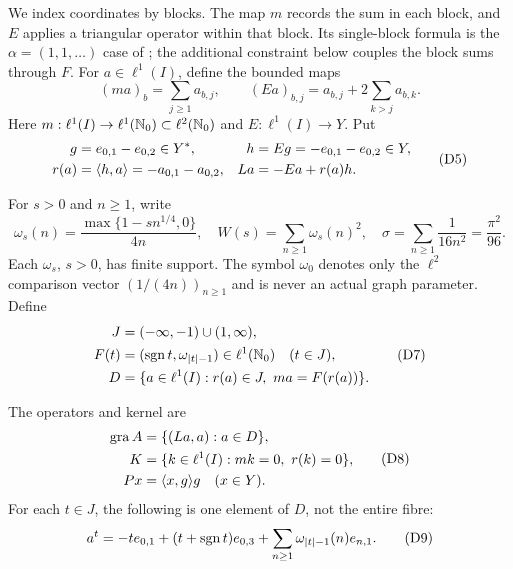 We index coordinates by blocks. The map $m$ records the sum in each block,
and $E$ applies a triangular operator within that block. Its single-block
formula is the $\alpha=(1,1,\ldots)$ case of
\cite[author version, Example~4.1]{bauschkeetal2011}; the additional constraint below
couples the block sums through $F$.
For $a\in\ell^1(I)$, define the bounded maps
\begin{equation}
(ma)_b=\sum_{j\ge1}a_{b,j},\qquad
(Ea)_{b,j}=a_{b,j}+2\sum_{k>j}a_{b,k}.
\tag{D4}\label{eq:D4}
\end{equation}
Here $m:\ell^1(I)\to\ell^1(\mathbb N_0)\subset\ell^2(\mathbb N_0)$ and
$E:\ell^1(I)\to Y$. Put
\begin{equation}
\begin{aligned}
g&=e_{0,1}-e_{0,2}\in Y^*,&
h&=Eg=-e_{0,1}-e_{0,2}\in Y,\\
r(a)&=\langle h,a\rangle=-a_{0,1}-a_{0,2},&
La&=-Ea+r(a)h.
\end{aligned}
\tag{D5}\label{eq:D5}
\end{equation}

For $s>0$ and $n\ge1$, write
\begin{equation}
\omega_s(n)=\frac{\max\{1-sn^{1/4},0\}}{4n},\quad
W(s)=\sum_{n\ge1}\omega_s(n)^2,\quad
\sigma=\sum_{n\ge1}\frac1{16n^2}=\frac{\pi^2}{96}.
\tag{D6}\label{eq:D6}
\end{equation}
Each $\omega_s$, $s>0$, has finite support. The symbol $\omega_0$ denotes only
the $\ell^2$ comparison vector $(1/(4n))_{n\ge1}$ and is never an actual
graph parameter. Define
\begin{equation}
\begin{aligned}
J&=(-\infty,-1)\cup(1,\infty),\\
F(t)&=(\operatorname{sgn} t,\omega_{|t|-1})\in\ell^1(\mathbb N_0)\quad(t\in J),\\
D&=\{a\in\ell^1(I):r(a)\in J,\ ma=F(r(a))\}.
\end{aligned}
\tag{D7}\label{eq:D7}
\end{equation}

The operators and kernel are
\begin{equation}
\begin{aligned}
\operatorname{gra} A&=\{(La,a):a\in D\},\\
K&=\{k\in\ell^1(I):mk=0,\ r(k)=0\},\\
Px&=\langle x,g\rangle g\quad(x\in Y).
\end{aligned}
\tag{D8}\label{eq:D8}
\end{equation}
For each $t\in J$, the following is one element of $D$, not the entire fibre:
\begin{equation}
a^t=-t e_{0,1}+(t+\operatorname{sgn} t)e_{0,3}
       +\sum_{n\ge1}\omega_{|t|-1}(n)e_{n,1}.
\tag{D9}\label{eq:D9}
\end{equation}

